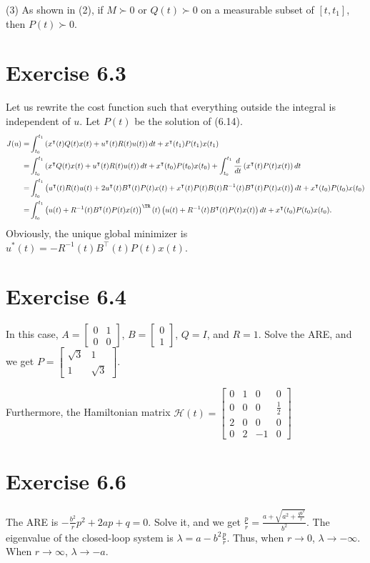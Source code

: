\documentclass[11pt]{report}
\newcommand{\T}{\intercal}
\begin{document}
(3) As shown in (2), if $M \succ 0$ or $Q(t) \succ 0$ on a measurable subset of $[t, t_1]$, then $P(t) \succ 0$.

\section*{Exercise 6.3}
Let us rewrite the cost function such that everything outside the integral is independent of $u$. Let $P(t)$ be the solution of (6.14).
\begin{align*}
J(u) = & \int_{t_0}^{t_1} \left(x^\T(t) Q(t) x(t) + u^\T(t) R(t) u(t)\right) d t + x^\T(t_1)P(t_1)x(t_1) \\ = & \int_{t_0}^{t_1} \left(x^\T Q(t) x(t) + u^\T(t) R(t) u(t)\right) d t + x^\T(t_0)P(t_0)x(t_0) + \int_{t_0}^{t_1} \frac{d}{dt}\left(x^\T(t)P(t)x(t)\right) dt \\ = & \int_{t_0}^{t_1} \left(u^\T(t) R(t) u(t) + 2u^\T(t)B^\T(t)P(t)x(t) + x^\T(t)P(t)B(t)R^{-1}(t)B^\T(t)P(t)x(t)\right) d t + x^\T(t_0)P(t_0)x(t_0) \\ = & \int_{t_0}^{t_1} \left(u(t) + R^{-1}(t)B^\T(t)P(t)x(t)\right)^\TR(t)\left(u(t) + R^{-1}(t)B^\T(t)P(t)x(t)\right) d t + x^\T(t_0)P(t_0)x(t_0).
\end{align*}
Obviously, the unique global minimizer is $u^*(t) = - R^{-1}(t)B^\T(t)P(t)x(t)$.

\section*{Exercise 6.4}
In this case, $A = \begin{bmatrix}0 & 1\\ 0 & 0\end{bmatrix}$, $B = \begin{bmatrix}0\\1\end{bmatrix}$, $Q = I$, and $R = 1$. Solve the ARE, and we get $P = \begin{bmatrix}\sqrt{3} & 1\\ 1 & \sqrt{3}\end{bmatrix}.$

Furthermore, the Hamiltonian matrix $\mathcal{H}(t) = \begin{bmatrix}0 & 1 & 0 & 0\\ 0 & 0 & 0 & \frac{1}{2}\\ 2 & 0 & 0 & 0 \\0 & 2 & -1 & 0\end{bmatrix}$

\section*{Exercise 6.6}
The ARE is $-\frac{b^2}{r}p^2 + 2ap + q = 0$. Solve it, and we get $\frac{p}{r} = \frac{a + \sqrt{a^2+\frac{qb^2}{r}}}{b^2}$. The eigenvalue of the closed-loop system is $\lambda = a - b^2\frac{p}{r}$. Thus, when $r \to 0$, $\lambda \to -\infty$. When $r \to \infty$, $\lambda \to -a$.
\end{document}
